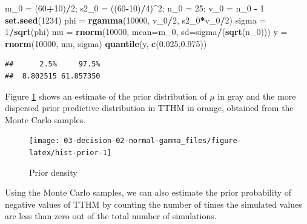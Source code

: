 \documentclass[]{book}
\newenvironment{Shaded}{\begin{snugshade}}{\end{snugshade}}
\newcommand{\KeywordTok}[1]{\textcolor[rgb]{0.13,0.29,0.53}{\textbf{#1}}}
\newcommand{\DataTypeTok}[1]{\textcolor[rgb]{0.13,0.29,0.53}{#1}}
\newcommand{\DecValTok}[1]{\textcolor[rgb]{0.00,0.00,0.81}{#1}}
\newcommand{\FloatTok}[1]{\textcolor[rgb]{0.00,0.00,0.81}{#1}}
\newcommand{\StringTok}[1]{\textcolor[rgb]{0.31,0.60,0.02}{#1}}
\newcommand{\OperatorTok}[1]{\textcolor[rgb]{0.81,0.36,0.00}{\textbf{#1}}}
\newcommand{\NormalTok}[1]{#1}
\theoremstyle{definition}
\theoremstyle{definition}
\theoremstyle{definition}
\theoremstyle{remark}
\begin{document}
\begin{Shaded}
\begin{Highlighting}[]
\NormalTok{m_}\DecValTok{0}\NormalTok{ =}\StringTok{ }\NormalTok{(}\DecValTok{60}\OperatorTok{+}\DecValTok{10}\NormalTok{)}\OperatorTok{/}\DecValTok{2}\NormalTok{; s2_}\DecValTok{0}\NormalTok{ =}\StringTok{ }\NormalTok{((}\DecValTok{60}\OperatorTok{-}\DecValTok{10}\NormalTok{)}\OperatorTok{/}\DecValTok{4}\NormalTok{)}\OperatorTok{^}\DecValTok{2}\NormalTok{;}
\NormalTok{n_}\DecValTok{0}\NormalTok{ =}\StringTok{ }\DecValTok{25}\NormalTok{; v_}\DecValTok{0}\NormalTok{ =}\StringTok{ }\NormalTok{n_}\DecValTok{0} \OperatorTok{-}\StringTok{ }\DecValTok{1}
\KeywordTok{set.seed}\NormalTok{(}\DecValTok{1234}\NormalTok{)}
\NormalTok{phi =}\StringTok{ }\KeywordTok{rgamma}\NormalTok{(}\DecValTok{10000}\NormalTok{, v_}\DecValTok{0}\OperatorTok{/}\DecValTok{2}\NormalTok{, s2_}\DecValTok{0}\OperatorTok{*}\NormalTok{v_}\DecValTok{0}\OperatorTok{/}\DecValTok{2}\NormalTok{)}
\NormalTok{sigma =}\StringTok{ }\DecValTok{1}\OperatorTok{/}\KeywordTok{sqrt}\NormalTok{(phi)}
\NormalTok{mu =}\StringTok{ }\KeywordTok{rnorm}\NormalTok{(}\DecValTok{10000}\NormalTok{, }\DataTypeTok{mean=}\NormalTok{m_}\DecValTok{0}\NormalTok{, }\DataTypeTok{sd=}\NormalTok{sigma}\OperatorTok{/}\NormalTok{(}\KeywordTok{sqrt}\NormalTok{(n_}\DecValTok{0}\NormalTok{)))}
\NormalTok{y =}\StringTok{ }\KeywordTok{rnorm}\NormalTok{(}\DecValTok{10000}\NormalTok{, mu, sigma)}
\KeywordTok{quantile}\NormalTok{(y, }\KeywordTok{c}\NormalTok{(}\FloatTok{0.025}\NormalTok{,}\FloatTok{0.975}\NormalTok{))}
\end{Highlighting}
\end{Shaded}

\begin{verbatim}
##      2.5%     97.5% 
##  8.802515 61.857350
\end{verbatim}

Figure \ref{fig:hist-prior} shows an estimate of the prior distribution
of \(\mu\) in gray and the more dispersed prior predictive distribution
in TTHM in orange, obtained from the Monte Carlo samples.

\begin{figure}

{\centering \texttt{[image: 03-decision-02-normal-gamma\_files/figure-latex/hist-prior-1]} 

}

\caption{Prior density}\label{fig:hist-prior}
\end{figure}

Using the Monte Carlo samples, we can also estimate the prior
probability of negative values of TTHM by counting the number of times
the simulated values are less than zero out of the total number of
simulations.
\end{document}
